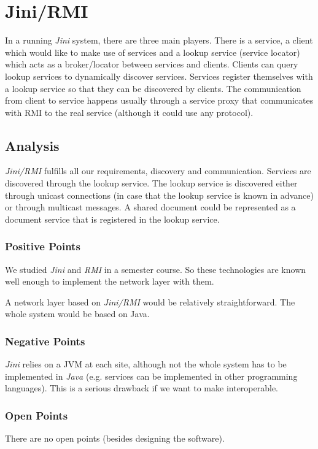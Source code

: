 \section{Jini/RMI}
\label{sect:jini}

In a running \emph{Jini} system, there are three main players. There is a service, a client which would like to make use of services and a lookup service (service locator) which acts as a broker/locator between services and clients. Clients can query lookup services to dynamically discover services. Services register themselves with a lookup service so that they can be discovered by clients. The communication from client to service happens usually through a service proxy that communicates with RMI to the real service (although it could use any protocol).



\subsection{Analysis}
\emph{Jini/RMI} fulfills all our requirements, discovery and communication. Services are discovered through the lookup service. The lookup service is discovered either through unicast connections (in case that the lookup service is known in advance) or through multicast messages. A shared document could be represented as a document service that is registered in the lookup service.

\subsubsection{Positive Points}
We studied \emph{Jini} and \emph{RMI} in a semester course. So these technologies are known well enough to implement the network layer with them.

A network layer based on \emph{Jini/RMI} would be relatively straightforward. The whole system would be based on Java.

\subsubsection{Negative Points}
\emph{Jini} relies on a JVM at each site, although not the whole system has to be implemented in \emph{Java} (e.g. services can be implemented in other programming languages). This is a serious drawback if we want to make \ace interoperable.

\subsubsection{Open Points}
There are no open points (besides designing the software).

